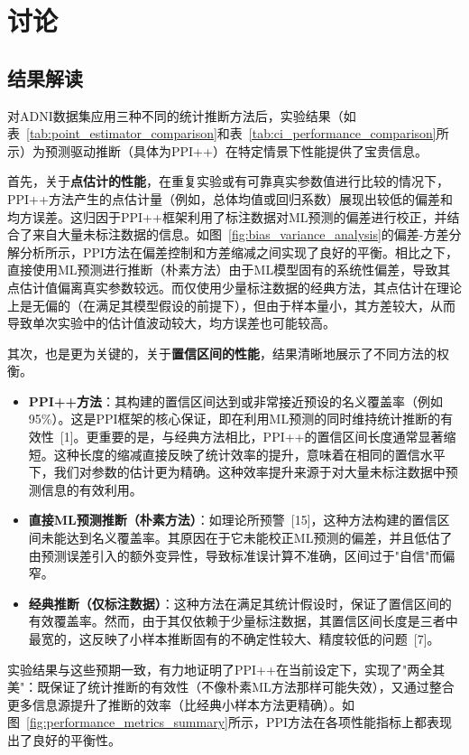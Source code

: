 \documentclass[12pt,a4paper]{article}
\begin{document}
\section{讨论}
\label{sec:discussion}

\subsection{结果解读}
\label{sec:results_interpretation}
对ADNI数据集应用三种不同的统计推断方法后，实验结果（如表~\ref{tab:point_estimator_comparison}和表~\ref{tab:ci_performance_comparison}所示）为预测驱动推断（具体为PPI++）在特定情景下性能提供了宝贵信息。

首先，关于\textbf{点估计的性能}，在重复实验或有可靠真实参数值进行比较的情况下，PPI++方法产生的点估计量（例如，总体均值或回归系数）展现出较低的偏差和均方误差。这归因于PPI++框架利用了标注数据对ML预测的偏差进行校正，并结合了来自大量未标注数据的信息。如图~\ref{fig:bias_variance_analysis}的偏差-方差分解分析所示，PPI方法在偏差控制和方差缩减之间实现了良好的平衡。相比之下，直接使用ML预测进行推断（朴素方法）由于ML模型固有的系统性偏差，导致其点估计值偏离真实参数较远。而仅使用少量标注数据的经典方法，其点估计在理论上是无偏的（在满足其模型假设的前提下），但由于样本量小，其方差较大，从而导致单次实验中的估计值波动较大，均方误差也可能较高。

其次，也是更为关键的，关于\textbf{置信区间的性能}，结果清晰地展示了不同方法的权衡。
\begin{itemize}
    \item \textbf{PPI++方法}：其构建的置信区间达到或非常接近预设的名义覆盖率（例如95\%）。这是PPI框架的核心保证，即在利用ML预测的同时维持统计推断的有效性~{[1]}。更重要的是，与经典方法相比，PPI++的置信区间长度通常显著缩短。这种长度的缩减直接反映了统计效率的提升，意味着在相同的置信水平下，我们对参数的估计更为精确。这种效率提升来源于对大量未标注数据中预测信息的有效利用。
    \item \textbf{直接ML预测推断（朴素方法）}：如理论所预警~{[15]}，这种方法构建的置信区间未能达到名义覆盖率。其原因在于它未能校正ML预测的偏差，并且低估了由预测误差引入的额外变异性，导致标准误计算不准确，区间过于"自信"而偏窄。
    \item \textbf{经典推断（仅标注数据）}：这种方法在满足其统计假设时，保证了置信区间的有效覆盖率。然而，由于其仅依赖于少量标注数据，其置信区间长度是三者中最宽的，这反映了小样本推断固有的不确定性较大、精度较低的问题~{[7]}。
\end{itemize}
实验结果与这些预期一致，有力地证明了PPI++在当前设定下，实现了"两全其美"：既保证了统计推断的有效性（不像朴素ML方法那样可能失效），又通过整合更多信息源提升了推断的效率（比经典小样本方法更精确）。如图~\ref{fig:performance_metrics_summary}所示，PPI方法在各项性能指标上都表现出了良好的平衡性。
\end{document}
